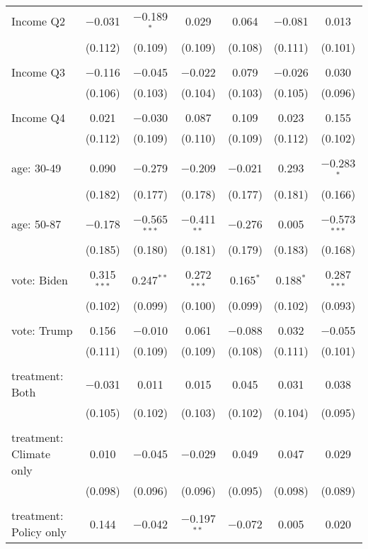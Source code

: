 \begin{tabular}{@{\extracolsep{5pt}}lcccccc}
 Income Q2 & $-$0.031 & $-$0.189$^{*}$ & 0.029 & 0.064 & $-$0.081 & 0.013 \\ 
  & (0.112) & (0.109) & (0.109) & (0.108) & (0.111) & (0.101) \\ 
  & & & & & & \\ 
 Income Q3 & $-$0.116 & $-$0.045 & $-$0.022 & 0.079 & $-$0.026 & 0.030 \\ 
  & (0.106) & (0.103) & (0.104) & (0.103) & (0.105) & (0.096) \\ 
  & & & & & & \\ 
 Income Q4 & 0.021 & $-$0.030 & 0.087 & 0.109 & 0.023 & 0.155 \\ 
  & (0.112) & (0.109) & (0.110) & (0.109) & (0.112) & (0.102) \\ 
  & & & & & & \\ 
 age: 30-49 & 0.090 & $-$0.279 & $-$0.209 & $-$0.021 & 0.293 & $-$0.283$^{*}$ \\ 
  & (0.182) & (0.177) & (0.178) & (0.177) & (0.181) & (0.166) \\ 
  & & & & & & \\ 
 age: 50-87 & $-$0.178 & $-$0.565$^{***}$ & $-$0.411$^{**}$ & $-$0.276 & 0.005 & $-$0.573$^{***}$ \\ 
  & (0.185) & (0.180) & (0.181) & (0.179) & (0.183) & (0.168) \\ 
  & & & & & & \\ 
 vote: Biden & 0.315$^{***}$ & 0.247$^{**}$ & 0.272$^{***}$ & 0.165$^{*}$ & 0.188$^{*}$ & 0.287$^{***}$ \\ 
  & (0.102) & (0.099) & (0.100) & (0.099) & (0.102) & (0.093) \\ 
  & & & & & & \\ 
 vote: Trump & 0.156 & $-$0.010 & 0.061 & $-$0.088 & 0.032 & $-$0.055 \\ 
  & (0.111) & (0.109) & (0.109) & (0.108) & (0.111) & (0.101) \\ 
  & & & & & & \\ 
 treatment: Both & $-$0.031 & 0.011 & 0.015 & 0.045 & 0.031 & 0.038 \\ 
  & (0.105) & (0.102) & (0.103) & (0.102) & (0.104) & (0.095) \\ 
  & & & & & & \\ 
 treatment: Climate only & 0.010 & $-$0.045 & $-$0.029 & 0.049 & 0.047 & 0.029 \\ 
  & (0.098) & (0.096) & (0.096) & (0.095) & (0.098) & (0.089) \\ 
  & & & & & & \\ 
 treatment: Policy only & 0.144 & $-$0.042 & $-$0.197$^{**}$ & $-$0.072 & 0.005 & 0.020 \\ 

\end{tabular}
